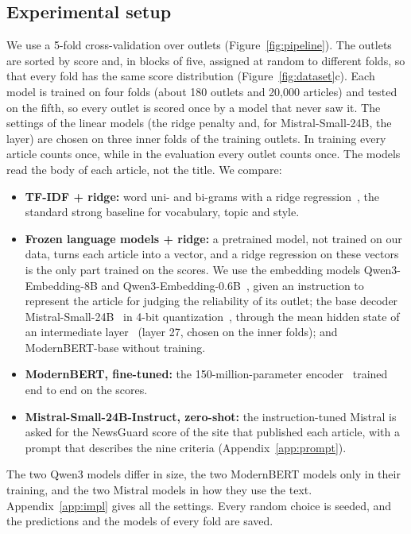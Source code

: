 \documentclass[11pt,a4paper]{article}
\begin{document}
\subsection{Experimental setup}\label{sec:setup}
We use a 5-fold cross-validation over outlets (Figure~\ref{fig:pipeline}). The outlets are sorted by score and, in
blocks of five, assigned at random to different folds, so that every fold has the same score distribution
(Figure~\ref{fig:dataset}c). Each model is trained on four folds (about 180 outlets and 20,000 articles) and tested on
the fifth, so every outlet is scored once by a model that never saw it. The settings of the linear models (the ridge
penalty and, for Mistral-Small-24B, the layer) are chosen on three inner folds of the training outlets. In training every
article counts once, while in the evaluation every outlet counts once. The models read the body of each article, not the
title. We compare:
\begin{itemize}
  \item \textbf{TF-IDF + ridge:} word uni- and bi-grams with a ridge regression~\cite{hoerl1970ridge}, the standard
        strong baseline for vocabulary, topic and style.
  \item \textbf{Frozen language models + ridge:} a pretrained model, not trained on our data, turns each article into a
        vector, and a ridge regression on these vectors is the only part trained on the scores. We use the embedding
        models Qwen3-Embedding-8B and Qwen3-Embedding-0.6B~\cite{zhang2025qwen3}, given an instruction to represent the
        article for judging the reliability of its outlet; the base decoder Mistral-Small-24B~\cite{mistralsmall} in
        4-bit quantization~\cite{dettmers2023qlora}, through the mean hidden state of an intermediate
        layer~\cite{skean2025layer} (layer 27, chosen on the inner folds); and ModernBERT-base without training.
  \item \textbf{ModernBERT, fine-tuned:} the 150-million-parameter encoder~\cite{warner2024modernbert} trained end to end
        on the scores.
  \item \textbf{Mistral-Small-24B-Instruct, zero-shot:} the instruction-tuned Mistral is asked for the NewsGuard score of
        the site that published each article, with a prompt that describes the nine criteria (Appendix~\ref{app:prompt}).
\end{itemize}
The two Qwen3 models differ in size, the two ModernBERT models only in their training, and the two Mistral models in how
they use the text. Appendix~\ref{app:impl} gives all the settings. Every random choice is seeded, and the predictions and the models of
every fold are saved.
\end{document}
